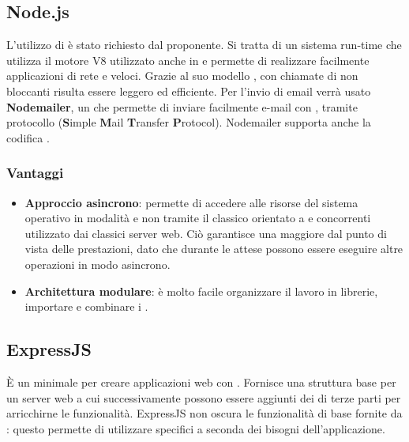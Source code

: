 \subsection{Node.js}
L'utilizzo di  \`e stato richiesto dal proponente. Si tratta di un sistema run-time  che utilizza il motore  V8 utilizzato anche in  e permette di realizzare facilmente applicazioni di rete  e veloci. Grazie al suo modello , con chiamate di  non bloccanti risulta essere leggero ed efficiente. Per l'invio di email verrà usato \textbf{Nodemailer}, un  che permette di inviare facilmente e-mail con , tramite protocollo  (\textbf{S}imple \textbf{M}ail \textbf{T}ransfer \textbf{P}rotocol). Nodemailer supporta anche la codifica .
\subsubsection{Vantaggi}
\begin{itemize}
\item \textbf{Approccio asincrono}: permette di accedere alle risorse del sistema operativo in modalit\`a  e non tramite il classico  orientato a  e  concorrenti utilizzato dai classici server web. Ci\`o garantisce una maggiore  dal punto di vista delle prestazioni, dato che durante le attese possono essere eseguire altre operazioni in modo asincrono.
\item \textbf{Architettura modulare}: \`e molto facile organizzare il lavoro in librerie, importare e combinare i .
\end{itemize}

\subsection{ExpressJS}
È un  minimale per creare applicazioni web con . Fornisce una struttura base per un server web a cui successivamente possono essere aggiunti dei  di terze parti per arricchirne le funzionalità. ExpressJS non oscura le funzionalità di base fornite da : questo permette di utilizzare  specifici a seconda dei bisogni dell'applicazione.
